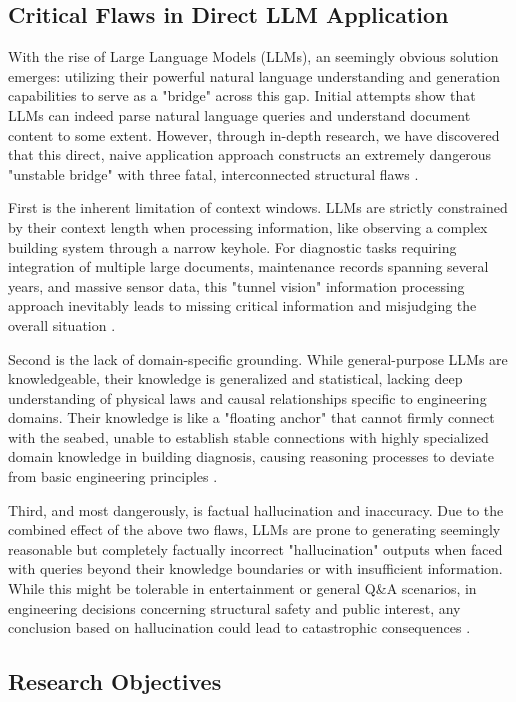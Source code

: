 \subsection{Critical Flaws in Direct LLM Application}

With the rise of Large Language Models (LLMs), an seemingly obvious solution emerges: utilizing their powerful natural language understanding and generation capabilities to serve as a "bridge" across this gap. Initial attempts show that LLMs can indeed parse natural language queries and understand document content to some extent. However, through in-depth research, we have discovered that this direct, naive application approach constructs an extremely dangerous "unstable bridge" with three fatal, interconnected structural flaws \cite{ji2023survey}.

First is the inherent limitation of context windows. LLMs are strictly constrained by their context length when processing information, like observing a complex building system through a narrow keyhole. For diagnostic tasks requiring integration of multiple large documents, maintenance records spanning several years, and massive sensor data, this "tunnel vision" information processing approach inevitably leads to missing critical information and misjudging the overall situation \cite{liu2023lost}.

Second is the lack of domain-specific grounding. While general-purpose LLMs are knowledgeable, their knowledge is generalized and statistical, lacking deep understanding of physical laws and causal relationships specific to engineering domains. Their knowledge is like a "floating anchor" that cannot firmly connect with the seabed, unable to establish stable connections with highly specialized domain knowledge in building diagnosis, causing reasoning processes to deviate from basic engineering principles \cite{harnad1990symbol}.

Third, and most dangerously, is factual hallucination and inaccuracy. Due to the combined effect of the above two flaws, LLMs are prone to generating seemingly reasonable but completely factually incorrect "hallucination" outputs when faced with queries beyond their knowledge boundaries or with insufficient information. While this might be tolerable in entertainment or general Q\&A scenarios, in engineering decisions concerning structural safety and public interest, any conclusion based on hallucination could lead to catastrophic consequences \cite{zhang2023siren}.

\subsection{Research Objectives}


